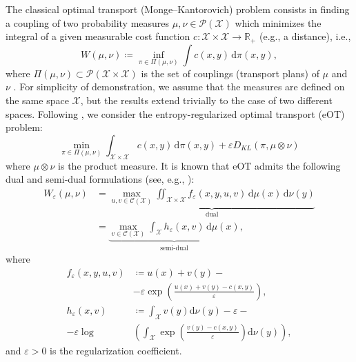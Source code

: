 \documentclass{article}
\newcommand{\dd}{\,\mathrm{d}}
\newcommand{\Pspace}{\mathcal{P}}
\newcommand{\R}{\mathbb{R}}
\newcommand*{\eqset}{\coloneqq}
\def\cX{\mathcal{X}}
\theoremstyle{plain}
\theoremstyle{definition}
\theoremstyle{remark}
\begin{document}
The classical optimal transport (Monge--Kantorovich) problem consists in finding a coupling of two probability measures $\mu, \nu \in \Pspace(\cX)$ which minimizes the integral of a given measurable cost function $c \colon \cX \times \cX \to \R_+$ (e.g., a distance), i.e.,
\begin{equation*}
    W(\mu, \nu) \eqset \inf_{\pi \in \Pi(\mu, \nu)} \int c(x, y) \dd \pi(x, y) ,
\end{equation*}
where $\Pi(\mu, \nu) \subset \Pspace(\cX \times \cX)$ is the set of couplings (transport plans) of $\mu$ and $\nu$ \citep[see][]{kantorovich1942translocation,villani2008optimal,santambrogio_optimal_2015}.
For simplicity of demonstration, we assume that the measures are defined on the same space \(\cX\), but the results extend trivially to the case of two different spaces. 
Following \citet{cuturi2013sinkhorn}, we consider the entropy-regularized optimal transport (eOT) problem:
\begin{equation}\label{eq:EOT}
    \min_{\pi \in \Pi(\mu, \nu)} \int_{ {\cX \times \cX}} c(x, y) \dd \pi(x, y) + \varepsilon D_{KL}(\pi, \mu \otimes \nu) 
\end{equation}
where $\mu \otimes \nu$ is the product measure.
It is known that eOT admits the following dual and semi-dual formulations (see, e.g., \cite{genevay2016stochastic}):
\begin{align}
    W_{\varepsilon}(\mu, \nu) \nonumber
    &= \underbrace{\max_{u,v \in \mathcal{C}(\mathcal{X})} \iint_{ {\cX \times \cX}} f_{\varepsilon}(x, y, u, v) \dd\mu(x)\dd\nu(y)}_{\text{dual}} \nonumber\\
    &= \underbrace{\max_{v \in \mathcal{C}(\cX)} \int_{ {\cX}} h_{\varepsilon}(x, v)\dd\mu(x)}_{\text{semi-dual}}, %
\end{align}
where
\begin{align}
    f_{\varepsilon}(x, y, u, v) &\eqset u(x)+v(y)- \nonumber \\
    &-\varepsilon \exp \left(\frac{u(x)+v(y)-c(x, y)}{\varepsilon}\right), \label{eq:f_eps} \\
    h_{\varepsilon}(x, v) 
    &\eqset \int_{ {\cX}} v(y) \mathrm{d} \nu(y) - \varepsilon - \nonumber\\
    - \varepsilon \log & \left(\int_{ {\cX}} \exp \left(\frac{v(y)-c(x, y)}{\varepsilon}\right) \mathrm{d} \nu(y)\right), \label{eq:h_eps}
\end{align}
and \(\varepsilon>0\) is the regularization coefficient.
\end{document}
